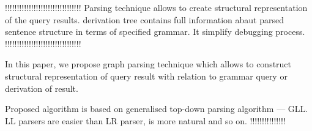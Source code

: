 \documentclass{sig-alternate} %
\begin{document}
!!!!!!!!!!!!!!!!!!!!!!!!!!!!!!!!
Parsing technique allows to create structural representation of the query results. derivation tree contains full information abaut parsed sentence structure in terms of specified grammar. It simplify debugging process. 
!!!!!!!!!!!!!!!!!!!!!!!!!!!!!!!!

In this paper, we propose graph parsing technique which allows to construct structural representation of query result with relation to grammar query or derivation of result.

Proposed algorithm is based on generalised top-down parsing algorithm --- GLL. LL parsers are easier than LR parser, is more natural and so on. !!!!!!!!!!!!!!!













\end{document}
